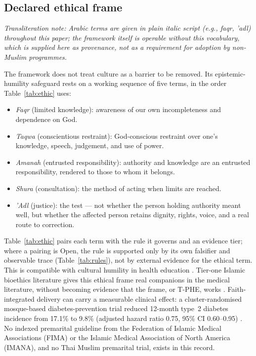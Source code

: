 \documentclass[11pt]{article}
\newcommand{\tphe}{T\mbox{-}PHE}
\begin{document}
\subsection{Declared ethical frame}
\emph{Transliteration note: Arabic terms are given in plain italic script (e.g., \emph{faqr}, \emph{\textquoteright adl}) throughout this paper; the framework itself is operable without this vocabulary, which is supplied here as provenance, not as a requirement for adoption by non-Muslim programmes.}

The framework does not treat culture as a barrier to be removed. Its epistemic-humility safeguard rests on a working sequence of five terms, in the order Table~\ref{tab:ethic} uses:
\begin{itemize}
\item \emph{Faqr} (limited knowledge): awareness of our own incompleteness and dependence on God.
\item \emph{Taqwa} (conscientious restraint): God-conscious restraint over one's knowledge, speech, judgement, and use of power.
\item \emph{Amanah} (entrusted responsibility): authority and knowledge are an entrusted responsibility, rendered to those to whom it belongs.
\item \emph{Shura} (consultation): the method of acting when limits are reached.
\item \emph{\textquoteright Adl} (justice): the test --- not whether the person holding authority meant well, but whether the affected person retains dignity, rights, voice, and a real route to correction.
\end{itemize}
Table~\ref{tab:ethic} pairs each term with the rule it governs and an evidence tier; where a pairing is Open, the rule is supported only by its own falsifier and observable trace (Table~\ref{tab:rules}), not by external evidence for the ethical term. This is compatible with cultural humility in health education \cite{ref58}. Tier-one Islamic bioethics literature gives this ethical frame real companions in the medical literature, without becoming evidence that the frame, or \tphe{}, works \cite{ref225,ref228}. Faith-integrated delivery can carry a measurable clinical effect: a cluster-randomised mosque-based diabetes-prevention trial reduced 12-month type~2 diabetes incidence from 17.1\% to 9.8\% (adjusted hazard ratio 0.75, 95\% CI 0.60--0.95) \cite{ref231}. No indexed premarital guideline from the Federation of Islamic Medical Associations (FIMA) or the Islamic Medical Association of North America (IMANA), and no Thai Muslim premarital trial, exists in this record.
\end{document}
